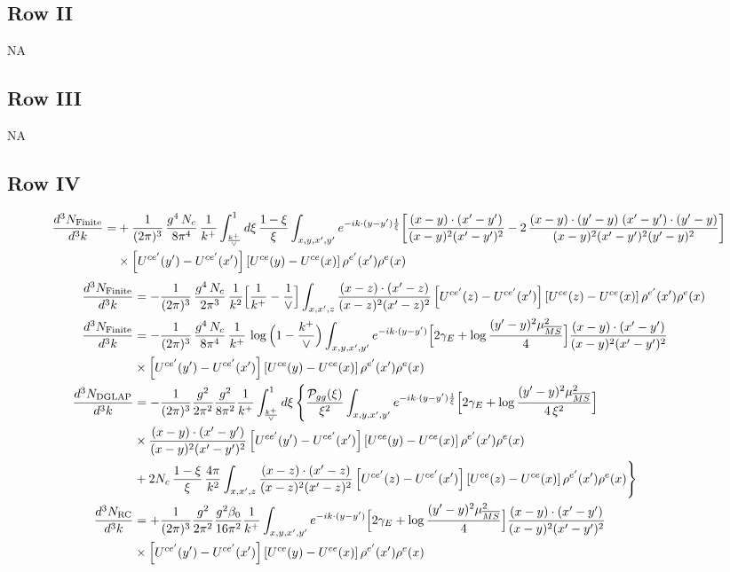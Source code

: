 \documentclass[9pt]{article}
\numberwithin{equation}{section}
\begin{document}
\subsection{Row II}
\textsc{NA}
\subsection{Row III}
\textsc{NA}
\subsection{Row IV}
\begin{align}
\frac{d^{3}N_{\rm Finite}}{d^{3}k}= &  +\frac{1}{(2\pi)^{3}}\,\frac{g^{4}\,N_{c}}{8\pi^{4}}\,\frac{1}{k^{+}}\int_{\frac{k^{+}}{\vee}}^{1}d\xi\,\frac{1-\xi}{\xi}\int_{x,y,x',y'}e^{-ik\cdot(y-y')\frac{1}{\xi}}\bigg[\frac{(x-y)\cdot(x'-y')}{(x-y)^{2}(x'-y')^{2}}-2\,\frac{(x-y)\cdot(y'-y)\;(x'-y')\cdot(y'-y)}{(x-y)^{2}(x'-y')^{2}(y'-y)^{2}}\bigg]\notag\\
&\times\left[U^{ce'}(y') - U^{ce'}(x')\right]\left[U^{ce}(y) - U^{ce}(x)\right]\rho^{e'}(x')\rho^{e}(x)
\end{align}
\begin{align} 
\frac{d^{3}N_{\rm Finite}}{d^{3}k} & = -\frac{1}{(2\pi)^{3}}\,\frac{g^{4}\,N_{c}}{2\pi^{3}}\,\frac{1}{k^{2}}\Big[\frac{1}{k^{+}}-\frac{1}{\vee}\Big]\int_{x,x',z}\frac{(x-z)\cdot(x'-z)}{(x-z)^{2}(x'-z)^{2}}\left[U^{ce'}(z) - U^{ce'}(x')\right]\left[U^{ce}(z) - U^{ce}(x)\right]\rho^{e'}(x')\rho^{e}(x)\notag \\ \frac{d^{3}N_{\rm Finite}}{d^{3}k} & = -\frac{1}{(2\pi)^{3}}\,\frac{g^{4}\,N_{c}}{8\pi^{4}}\,\frac{1}{k^{+}}\,\log\Big(1-\frac{k^{+}}{\vee}\Big)\int_{x,y,x',y'}e^{-ik\cdot(y-y')}\Big[2\gamma_{E}+\log\frac{(y'-y)^{2}\mu^{2}_{\overline{MS}}}{4}\Big]\frac{(x-y)\cdot(x'-y')}{(x-y)^{2}(x'-y')^{2}}\notag \\ & \times\left[U^{ce'}(y') - U^{ce'}(x')\right]\left[U^{ce}(y) - U^{ce}(x)\right]\rho^{e'}(x')\rho^{e}(x)\notag \\ \frac{d^{3}N_{\rm DGLAP}}{d^{3}k} & = -\frac{1}{(2\pi)^{3}}\frac{g^{2}}{2\pi^{2}}\frac{g^{2}}{8\pi^{2}}\frac{1}{k^{+}}\int_{\frac{k^{+}}{\vee}}^{1}d\xi\,\Bigg\{\frac{\mathcal P_{gg}(\xi)}{\xi^{2}}\int_{x,y,x',y'}e^{-ik\cdot(y-y')\frac{1}{\xi}}\Big[2\gamma_{E}+\log\frac{(y'-y)^{2}\mu^{2}_{\overline{MS}}}{4\,\xi^{2}}\Big]\notag \\ & \times\frac{(x-y)\cdot(x'-y')}{(x-y)^{2}(x'-y')^{2}}\left[U^{ce'}(y') - U^{ce'}(x')\right]\left[U^{ce}(y) - U^{ce}(x)\right]\rho^{e'}(x')\rho^{e}(x)\notag \\ & +2N_{c}\,\frac{1-\xi}{\xi}\,\frac{4\pi}{k^{2}}\int_{x,x',z}\frac{(x-z)\cdot(x'-z)}{(x-z)^{2}(x'-z)^{2}}\left[U^{ce'}(z) - U^{ce'}(x')\right]\left[U^{ce}(z) - U^{ce}(x)\right]\rho^{e'}(x')\rho^{e}(x)\Bigg\}\notag \\ \frac{d^{3}N_{\rm RC}}{d^{3}k} & = +\frac{1}{(2\pi)^{3}}\frac{g^{2}}{2\pi^{2}}\frac{g^{2}\beta_{0}}{16\pi^{2}}\frac{1}{k^{+}}\int_{x,y,x',y'}e^{-ik\cdot(y-y')}\Big[2\gamma_{E}+\log\frac{(y'-y)^{2}\mu^{2}_{\overline{MS}}}{4}\Big]\frac{(x-y)\cdot(x'-y')}{(x-y)^{2}(x'-y')^{2}}\notag \\ &\times\left[U^{ce'}(y') - U^{ce'}(x')\right]\left[U^{ce}(y) - U^{ce}(x)\right]\rho^{e'}(x')\rho^{e}(x)
\end{align}
\end{document}
